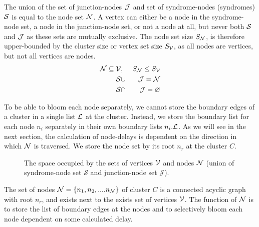 The union of the set of junction-nodes $\mathcal{J}$ and set of syndrome-nodes (syndromes) $\mathcal{S}$ is equal to the node set $\mathcal{N}$. A vertex can either be a node in the syndrome-node set, a node in the junction-node set, or not a node at all, but never both $\mathcal{S}$ and $\mathcal{J}$ as these sets are mutually exclusive. The node set size $S_{\mathcal{N}}$, is therefore upper-bounded by the cluster size or vertex set size $S_{\mathcal{V}}$, as all nodes are vertices, but not all vertices are nodes.
\begin{eqnarray}
  \mathcal{N} \subseteq \mathcal{V} &,& S_{\mathcal{N}} \leq S_{\mathcal{V}} \label{eq:sets}  \\
  \nonumber \mathcal{S} &\cup& \mathcal{J} = \mathcal{N} \\
  \nonumber \mathcal{S} &\cap& \mathcal{J} = \varnothing
\end{eqnarray}

To be able to bloom each node separately, we cannot store the boundary edges of a cluster in a single list $\mathcal{L}$ at the cluster. Instead, we store the boundary list for each node $n_i$ separately in their own boundary lists $n_i.\mathcal{L}$. As we will see in the next section, the calculation of node-delays is dependent on the direction in which $\mathcal{N}$ is traversed. We store the node set by its root $n_r$ at the cluster $C$.

\begin{figure}
  \centering
  \caption{The space occupied by the sets of vertices $\mathcal{V}$ and nodes $\mathcal{N}$ (union of syndrome-node set $\mathcal{S}$ and junction-node set $\mathcal{J}$).}\label{fig:sets}
\end{figure}

\begin{theorem}
  The set of nodes $\mathcal{N} = \{n_1, n_2, .... n_{\mathcal{N}}\}$ of cluster $C$ is a connected acyclic graph with root $n_r$, and exists next to the exists set of vertices $\mathcal{V}$. The function of $\mathcal{N}$ is to store the list of boundary edges at the nodes and to selectively bloom each node dependent on some calculated delay.
\end{theorem}


